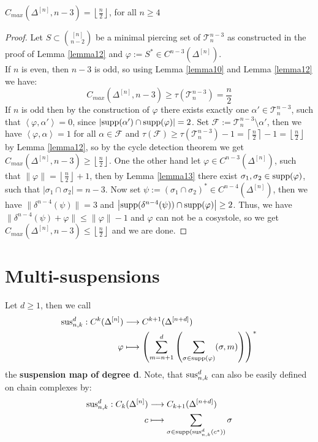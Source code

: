 \begin{thm}
\(C_{max}(\Delta^{[n]},n-3)=\left\lfloor\frac{n}{2}\right\rfloor\), for all \(n\geq 4\)
\begin{proof}
Let \(S\subset\binom{[n]}{n-2}\) be a minimal piercing set of \(\mathcal{T}_n^{n-3}\) as constructed in the proof of Lemma \ref{lemma12} and \(\varphi:=S^*\in C^{n-3}(\Delta^{[n]})\).\\
If \(n\) is even, then \(n-3\) is odd, so using Lemma \ref{lemma10} and Lemma \ref{lemma12} we have:
\[
C_{max}(\Delta^{[n]},n-3)\geq\tau(\mathcal{T}_n^{n-3})=\frac{n}{2}
\]
If \(n\) is odd then by the construction of \(\varphi\) there exists exactly one \(\alpha'\in\mathcal{T}_n^{n-3}\), such that \(\left\langle\varphi,\alpha'\right\rangle=0\), since \(\left|\mathrm{supp}(\alpha')\cap \mathrm{supp}(\varphi)\right|=2\). Set \(\mathcal{F}:=\mathcal{T}_n^{n-3}\setminus\alpha'\), then we have \(\left\langle\varphi,\alpha\right\rangle=1\) for all \(\alpha\in\mathcal{F}\) and \(\tau(\mathcal{F})\geq\tau(\mathcal{T}_n^{n-3})-1=\left\lceil\frac{n}{2}\right\rceil-1=\left\lfloor\frac{n}{2}\right\rfloor\) by Lemma \ref{lemma12}, so by the cycle detection theorem we get \(C_{max}(\Delta^{[n]},n-3)\geq\left\lfloor\frac{n}{2}\right\rfloor\). One the other hand let \(\varphi\in C^{n-3}(\Delta^{[n]})\), such that \(\|\varphi\|=\left\lfloor\frac{n}{2}\right\rfloor+1\), then by Lemma \ref{lemma13} there exist \(\sigma_1,\sigma_2\in \mathrm{supp}(\varphi)\), such that \(\left|\sigma_1\cap\sigma_2\right|=n-3\). Now set \(\psi:=(\sigma_1\cap\sigma_2)^*\in C^{n-4}(\Delta^{[n]})\), then we have \(\|\delta^{n-4}(\psi)\|=3\) and \(\left|\mathrm{supp}(\delta^{n-4}(\psi))\cap \mathrm{supp}(\varphi)\right|\geq 2\). Thus, we have \(\|\delta^{n-4}(\psi)+\varphi\|\leq\|\varphi\|-1\) and \(\varphi\) can not be a cosystole, so we get \(C_{max}(\Delta^{[n]},n-3)\leq\left\lfloor\frac{n}{2}\right\rfloor\) and we are done.
\end{proof}
\end{thm}

\section{Multi-suspensions}

\begin{defi}
Let \(d\geq 1\), then we call
\begin{align}
\mathrm{sus}_{n,k}^d:C^k(\Delta^{[n]})&\longrightarrow C^{k+1}(\Delta^{[n+d]})\notag\\
\varphi&\longmapsto\left(\sum\limits_{m=n+1}^d\left(\sum\limits_{\sigma\in \mathrm{supp}(\varphi)}(\sigma,m)\right)\right)^*\notag
\end{align}
the \textbf{suspension map of degree d}. Note, that \(\mathrm{sus}_{n,k}^d\) can also be easily defined on chain complexes by:
\begin{align}
\mathrm{sus}_{n,k}^d:C_k(\Delta^{[n]})&\longrightarrow C_{k+1}(\Delta^{[n+d]})\notag\\
c&\longmapsto\sum\limits_{\sigma\in \mathrm{supp}(\mathrm{sus}_{n,k}^d(c^*))}\sigma\notag
\end{align}
\end{defi}


